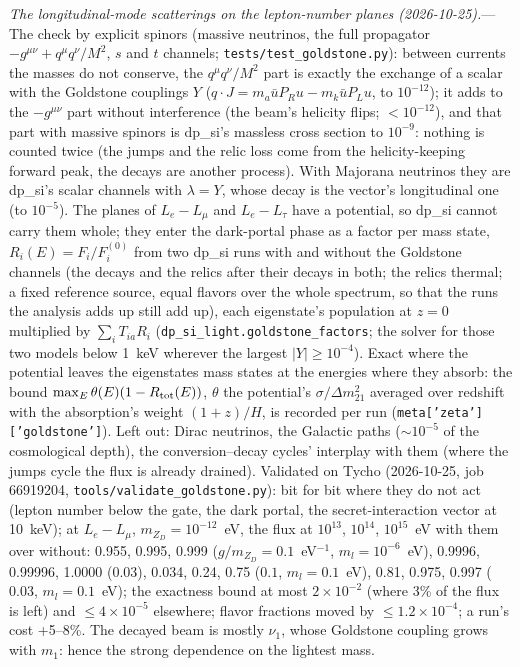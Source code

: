 \documentclass[11pt,a4paper]{article}
\newcommand{\file}[1]{\nolinkurl{#1}}
\newcommand{\mzd}{m_{Z_D}}
\begin{document}
\textit{The longitudinal-mode scatterings on the lepton-number planes (2026-10-25).}---The check by explicit spinors
(massive neutrinos, the full propagator $-g^{\mu\nu} + q^\mu q^\nu/M^2$, $s$ and $t$ channels;
\file{tests/test\_goldstone.py}): between currents the masses do not conserve, the $q^\mu q^\nu/M^2$ part is exactly the
exchange of a scalar with the Goldstone couplings $Y$ ($q\cdot J = m_a\bar u P_Ru - m_k\bar uP_Lu$, to $10^{-12}$); it adds to
the $-g^{\mu\nu}$ part without interference (the beam's helicity flips; $<10^{-12}$), and that part with massive spinors is
dp\_si's massless cross section to $10^{-9}$: nothing is counted twice (the jumps and the relic loss come from the
helicity-keeping forward peak, the decays are another process). With Majorana neutrinos they are dp\_si's scalar channels
with $\lambda = Y$, whose decay is the vector's longitudinal one (to $10^{-5}$). The planes of $L_e - L_\mu$ and
$L_e - L_\tau$ have a potential, so dp\_si cannot carry them whole; they enter the dark-portal phase as a factor per
mass state, $R_i(E) = F_i/F_i^{(0)}$ from two dp\_si runs with and without the Goldstone channels (the decays and the
relics after their decays in both; the relics thermal; a fixed reference source, equal flavors over the whole spectrum,
so that the runs the analysis adds up still add up), each eigenstate's population at $z = 0$ multiplied by
$\sum_iT_{ia}R_i$ (\texttt{dp\_si\_light.goldstone\_factors}; the solver for those two models below 1~keV wherever the
largest $|Y| \ge 10^{-4}$). Exact where the potential leaves the eigenstates mass states at the energies where they
absorb: the bound $\max_E\theta(E)(1 - R_{\rm tot}(E))$, $\theta$ the potential's $\sigma/\Delta m^2_{21}$ averaged over
redshift with the absorption's weight $(1+z)/H$, is recorded per run (\texttt{meta['zeta']['goldstone']}). Left out:
Dirac neutrinos, the Galactic paths ($\sim10^{-5}$ of the cosmological depth), the conversion--decay cycles' interplay
with them (where the jumps cycle the flux is already drained). Validated on Tycho (2026-10-25, job 66919204,
\file{tools/validate\_goldstone.py}): bit for bit where they do not act (lepton number below the gate, the dark portal,
the secret-interaction vector at 10~keV); at $L_e - L_\mu$, $\mzd = 10^{-12}$~eV, the flux at $10^{13}$, $10^{14}$,
$10^{15}$~eV with them over without: 0.955, 0.995, 0.999 ($g/\mzd = 0.1$~eV$^{-1}$, $m_l = 10^{-6}$~eV), 0.9996,
0.99996, 1.0000 ($0.03$), 0.034, 0.24, 0.75 ($0.1$, $m_l = 0.1$~eV), 0.81, 0.975, 0.997 ($0.03$, $m_l = 0.1$~eV);
the exactness bound at most $2\times10^{-2}$ (where 3\% of the flux is left) and $\le4\times10^{-5}$ elsewhere; flavor
fractions moved by $\le1.2\times10^{-4}$; a run's cost +5--8\%. The decayed beam is mostly $\nu_1$, whose Goldstone
coupling grows with $m_1$: hence the strong dependence on the lightest mass.
\end{document}
